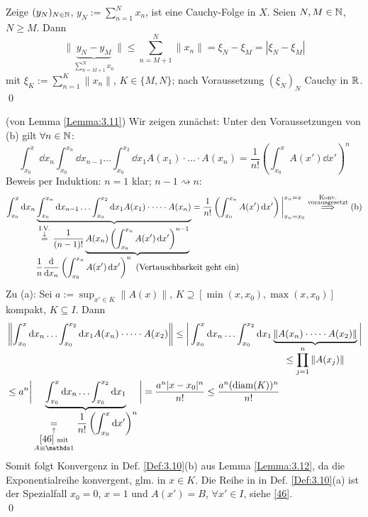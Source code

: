 \documentclass[a4paper]{article}
\begin{document}
\begin{Beweis}
Zeige $(y_N)_{N\in\operatorname{\mathbb N}}$, $y_N:=\sum_{n=1}^Nx_n$, ist eine Cauchy-Folge in $X$. Seien $N,M\in \operatorname{\mathbb N}$, $N\ge M$. Dann
\[\|\underbrace{y_N-y_M}_{\displaystyle\sum_{n=M+1}^Nx_n}\|\le \sum_{n=M+1}^N\|x_n\|=\xi_N-\xi_M=|\xi_N-\xi_M|\]
mit $\xi_K:=\sum_{n=1}^K\|x_n\|$, $K\in\{M,N\}$; nach Voraussetzung $(\xi_N)_N$ Cauchy in $\mathbb R$.\\\qed
\end{Beweis}

\begin{Beweis}
(von Lemma \ref{Lemma:3.11}) Wir zeigen zunächst: Unter den Voraussetzungen von (b) gilt $\forall n\in\operatorname{\mathbb N}$:
\[\int_{x_0}^x\dd x_n\int_{x_0}^{x_n}\dd x_{n-1}\dots\int_{x_0}^{x_2}\dd x_1A(x_1)\cdot \dots\cdot A(x_n)=\frac{1}{n!}\left(\int_{x_0}^xA(x')\dd x'\right)^n\tag{$*$}\label{46}\]
Beweis per Induktion: $n=1$ klar; $n-1\rightsquigarrow n$:
\[\int_{x_0}^x\dd x_n\underbrace{\int_{x_0}^{x_n}\dd x_{n-1}\dots\int_{x_0}^{x_2}\dd x_1A(x_1)\cdot \dots\cdot A(x_n)}_{\mathclap{\displaystyle
\overset{\substack{\text{I.V.}\\\downarrow}}{=}\frac{1}{(n-1)!}
\underbrace{\displaystyle A(x_n)\left(\int_{x_0}^{x_n}A(x')\dd x'\right)^{n-1}}_{\mathclap{\displaystyle\frac{1}{n}\frac{\dd }{\dd x_n}\left(\int_{x_0}^{x_n}A(x')\dd x'\right)^n\te{(Vertauschbarkeit geht ein)}}}
}}
=\frac{1}{n!}\left(\int_{x_0}^{x_n}A(x')\dd x'\right)\bigg{|}_{x_n=x_0}^{x_n=x}\overset{\substack{\text{Konv.}\\\text{vorausgesetzt}}}{\implies}\text{(b)}\]
Zu (a): Sei $a:=\sup_{x'\in K}\|A(x)\|$, $K\supseteq [\min(x,x_0),\max(x,x_0)]$ kompakt, $K\subseteq I$. Dann
\begin{align*}
&\left\|\int_{x_0}^x\dd x_n\dots\int_{x_0}^{x_2}\dd x_1A(x_n)\cdot\dots\cdot A(x_2) \right\|\le 
\bigg|\int_{x_0}^x\dd x_n\dots\int_{x_0}^{x_2}\dd x_1\underbrace{\|A(x_n)\cdot\dots\cdot A(x_2)\|}_{\displaystyle\le \prod_{j=1}^n\|A(x_j)\|}\bigg|\\
&\le a^n\bigg|\underbrace{\int_{x_0}^x\dd x_n\dots\int_{x_0}^{x_2}\dd x_1}_{\displaystyle\underset{\substack{\uparrow\\ \eqref{46}\te{mit}\\ A\equiv \mathds 1}}{=}\frac{1}{n!}\left(\int_{x_0}^x\dd x'\right)^n}\bigg|
=\frac{a^n|x-x_0|^n}{n!}
\le \frac{a^n(\diam(K))^n}{n!}
\end{align*}
Somit folgt Konvergenz in Def. \ref{Def:3.10}(b) aus Lemma \ref{Lemma:3.12}, da die Exponentialreihe konvergent, glm. in $x\in K$. Die Reihe in in Def. \ref{Def:3.10}(a) ist der Spezialfall $x_0=0$, $x=1$ und $A(x')=B$, $\forall x'\in I$, siehe \eqref{46}.\\\qed
\end{Beweis}
\end{document}
